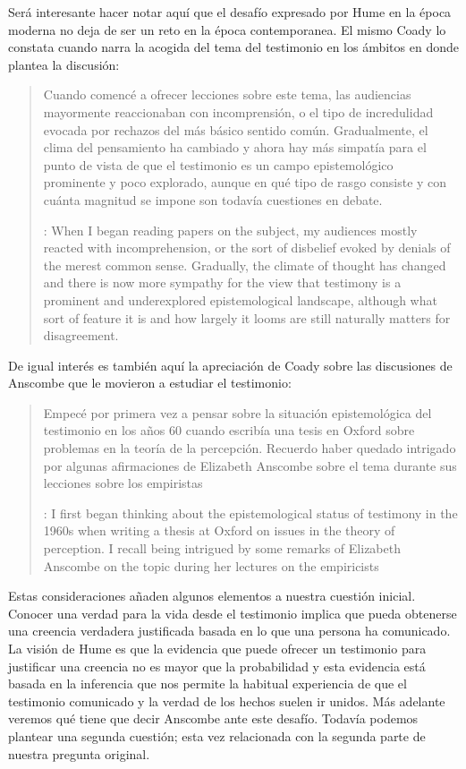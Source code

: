 Será interesante hacer notar aquí que el desafío expresado por Hume en la época moderna no deja de ser un reto en la época contemporanea. El mismo Coady lo constata cuando narra la acogida del tema del testimonio en los ámbitos en donde plantea la discusión: \blockquote[{\cite[vii]{coady1992test}}: When I began reading papers on the subject, my audiences mostly reacted with incomprehension, or the sort of disbelief evoked by denials of the merest common sense. Gradually, the climate of thought has changed and there is now more sympathy for the view that testimony is a prominent and underexplored epistemological landscape, although what sort of feature it is and how largely it looms are still naturally matters for disagreement.]{Cuando comencé a ofrecer lecciones sobre este tema, las audiencias mayormente reaccionaban con incomprensión, o el tipo de incredulidad evocada por rechazos del más básico sentido común. Gradualmente, el clima del pensamiento ha cambiado y ahora hay más simpatía para el punto de vista de que el testimonio es un campo epistemológico prominente y poco explorado, aunque en qué tipo de rasgo consiste y con cuánta magnitud se impone son todavía cuestiones en debate.} De igual interés es también aquí la apreciación de Coady sobre las discusiones de Anscombe que le movieron a estudiar el testimonio: \blockquote[{\cite[vii]{coady1992test}}: I first began thinking about the epistemological status of testimony in the 1960s when writing a thesis at Oxford on issues in the theory of perception. \textelp{} I recall being intrigued by some remarks of Elizabeth Anscombe on the topic during her lectures on the empiricists \textelp{}]{Empecé por primera vez a pensar sobre la situación epistemológica del testimonio en los años 60 cuando escribía una tesis en Oxford sobre problemas en la teoría de la percepción. \textelp{} Recuerdo haber quedado intrigado por algunas afirmaciones de Elizabeth Anscombe sobre el tema durante sus lecciones sobre los empiristas \textelp{}}

Estas consideraciones añaden algunos elementos a nuestra cuestión inicial. Conocer una verdad para la vida desde el testimonio implica que pueda obtenerse una creencia verdadera justificada basada en lo que una persona ha comunicado. La visión de Hume es que la evidencia que puede ofrecer un testimonio para justificar una creencia no es mayor que la probabilidad y esta evidencia está basada en la inferencia que nos permite la habitual experiencia de que el testimonio comunicado y la verdad de los hechos suelen ir unidos. Más adelante veremos qué tiene que decir Anscombe ante este desafío. Todavía podemos plantear una segunda cuestión; esta vez relacionada con la segunda parte de nuestra pregunta original.

